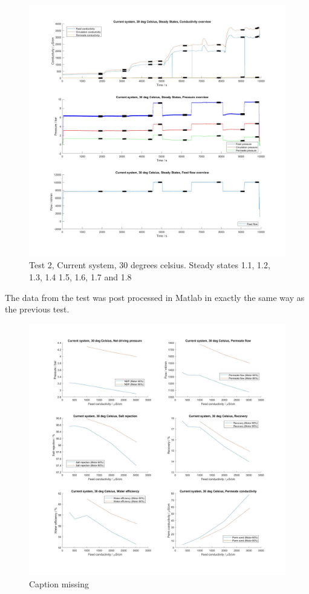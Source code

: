 \begin{figure}[H]
    \centering
    \includegraphics[width=1.1\textwidth]{overview30}
    \caption{Test 2, Current system, 30 degrees celsius. Steady states 1.1, 1.2, 1.3, 1.4 1.5, 1.6, 1.7 and 1.8}
    \label{fig:overw30}
\end{figure}

\newpage


The data from the test was post processed in Matlab in exactly the same way as the previous test.

\begin{figure}[H]
    \centering
    \includegraphics[width=1.1\textwidth]{Key30}
    \caption{Caption missing}
    \label{fig:K30}
\end{figure}


